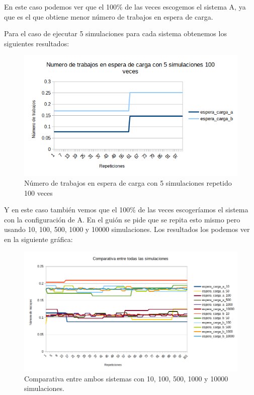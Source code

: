 \documentclass[11pt,a4paper]{report}
\begin{document}
En este caso podemos ver que el 100\% de las veces escogemos el sistema A, ya que es el que obtiene menor número de trabajos en espera de carga.

Para el caso de ejecutar 5 simulaciones para cada sistema obtenemos los siguientes resultados:

\begin{figure}[H]
\centering
\includegraphics[width=\textwidth]{img/cap-3/espera_carga_1-5-5.png}
\caption{Número de trabajos en espera de carga con 5 simulaciones repetido 100 veces}
\label{}
\end{figure}

Y en este caso también vemos que el 100\% de las veces escogeríamos el sistema con la configuración de A. En el guión se pide que se repita esto mismo pero usando 10, 100, 500, 1000 y 10000 simulaciones. Los resultados los podemos ver en la siguiente gráfica:

\begin{figure}[H]
\centering
\includegraphics[width=\textwidth]{img/cap-3/espera_carga_todos.png}
\caption{Comparativa entre ambos sistemas con 10, 100, 500, 1000 y 10000 simulaciones.}
\label{}
\end{figure}
\end{document}
